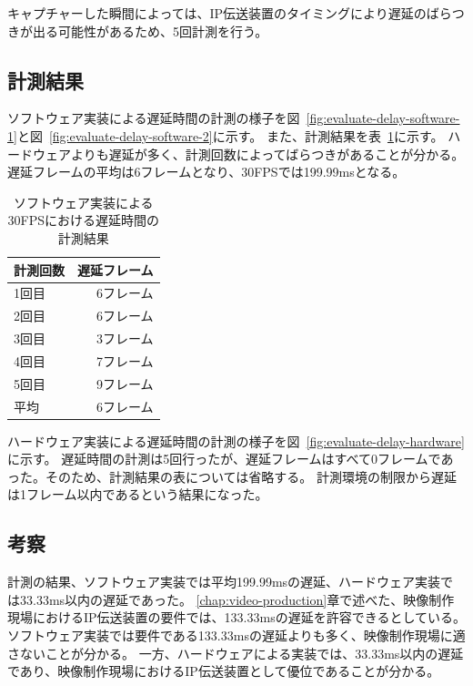 キャプチャーした瞬間によっては、IP伝送装置のタイミングにより遅延のばらつきが出る可能性があるため、5回計測を行う。

\subsection{計測結果}


ソフトウェア実装による遅延時間の計測の様子を図~\ref{fig:evaluate-delay-software-1}と図~\ref{fig:evaluate-delay-software-2}に示す。
また、計測結果を表~\ref{tb:evaluate-software-delay}に示す。
ハードウェアよりも遅延が多く、計測回数によってばらつきがあることが分かる。
遅延フレームの平均は6フレームとなり、30FPSでは199.99msとなる。

\begin{table}[htbp]
  \caption{ソフトウェア実装による30FPSにおける遅延時間の計測結果}
  \label{tb:evaluate-software-delay}
  \begin{center}
  \begin{tabular}{l|r}
    \hline
     計測回数 & 遅延フレーム \\\hline\hline
     1回目 & 6フレーム   \\\hline
     2回目 & 6フレーム   \\\hline
     3回目 & 3フレーム   \\\hline
     4回目 & 7フレーム   \\\hline
     5回目 & 9フレーム   \\\hline\hline
      平均 & 6フレーム   \\\hline
  \end{tabular}\end{center}
\end{table}

ハードウェア実装による遅延時間の計測の様子を図~\ref{fig:evaluate-delay-hardware}に示す。
遅延時間の計測は5回行ったが、遅延フレームはすべて0フレームであった。そのため、計測結果の表については省略する。
計測環境の制限から遅延は1フレーム以内であるという結果になった。

\subsection{考察}

計測の結果、ソフトウェア実装では平均199.99msの遅延、ハードウェア実装では33.33ms以内の遅延であった。
\ref{chap:video-production}章で述べた、映像制作現場におけるIP伝送装置の要件では、133.33msの遅延を許容できるとしている。
ソフトウェア実装では要件である133.33msの遅延よりも多く、映像制作現場に適さないことが分かる。
一方、ハードウェアによる実装では、33.33ms以内の遅延であり、映像制作現場におけるIP伝送装置として優位であることが分かる。

